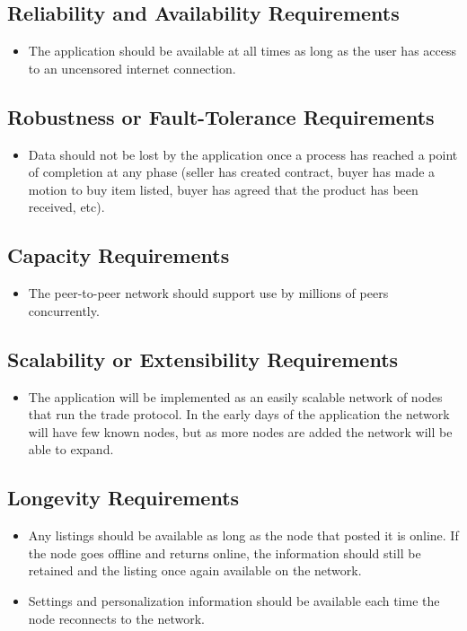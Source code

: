 \documentclass{article}
\begin{document}
\subsection{Reliability and Availability Requirements}
\begin{itemize}
\item
The application should be available at all times as long as the user has access to an uncensored internet connection.
	
\end{itemize}


\subsection{Robustness or Fault-Tolerance Requirements}
\begin{itemize}
\item
Data should not be lost by the application once a process has reached a point of completion at any phase (seller has created contract, buyer has made a motion to buy item listed, buyer has agreed that the product has been received, etc).  
\end{itemize}

\subsection{Capacity Requirements}
\begin{itemize}
	\item 
	The peer-to-peer network should support use by millions of peers concurrently. 
\end{itemize}

\subsection{Scalability or Extensibility Requirements}
\begin{itemize}
\item 
The application will be implemented as an easily scalable network of nodes that run the trade protocol. In the early days of the application the network will have few known nodes, but as more nodes are added the network will be able to expand. 
\end{itemize}

\subsection{Longevity Requirements}
\begin{itemize}
	\item 
	Any listings should be available as long as the node that posted it is online. If the node goes offline and returns online, the information should still be retained and the listing once again available on the network.
	\item
	Settings and personalization information should be available each time the node reconnects to the network.
\end{itemize}
\end{document}

